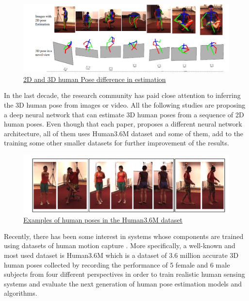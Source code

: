 \pagebreak

 \begin{figure}[h]
	\centering
	\includegraphics[width=1\textwidth]{figures/background/2D&3D.png}
	\caption{\href{https://arxiv.org/pdf/1612.06524.pdf}
	{2D and 3D human Pose difference in estimation}}
\end{figure}

In the last decade, the research community has paid close attention to inferring the 3D human pose from images or video. All the following studies \cite{Exploiting temporal information for 3D pose estimation,3D Human Pose Estimation from Deep Multi-View 2D Pose,3D Human Pose Estimation Using Convolutional Neural Networks with 2D Pose Information,3D Human Pose Estimation = 2D Pose Estimation + Matching}are proposing a deep neural network that can estimate 3D human poses  from a sequence of 2D human poses. Even though that each paper, proposes a different neural network architecture, all of them uses Human3.6M dataset and some of them, add to the training some other smaller datasets for further improvement of the results.\\

 \begin{figure}[h]
	\centering
	\includegraphics[width=1\textwidth]{figures/background/human36M.png}
	\caption{\href{https://vision.imar.ro/human3.6m/pami-h36m.pdf}
	{Examples of human poses in the Human3.6M dataset}}
\end{figure}

Recently, there has been some interest in systems whose components are trained using datasets of human motion capture . More specifically, a well-known and most used dataset is Human3.6M \cite{Human3.6M} which is a dataset of 3.6 million accurate 3D human poses collected by recording the performance of 5 female and 6 male subjects from four different perspectives in order to train realistic human sensing systems and evaluate the next generation of human pose estimation models and algorithms. \\




